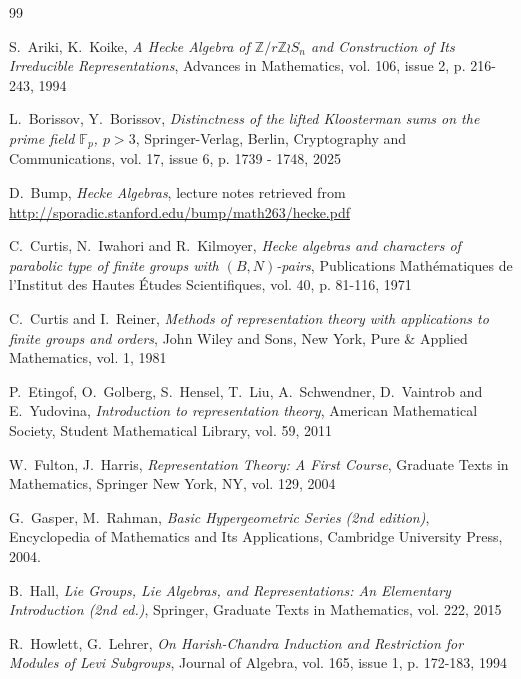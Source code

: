 \documentclass[12pt,reqno]{amsart}
\theoremstyle{definition}
\theoremstyle{remark}
\numberwithin{equation}{section}
\begin{document}
\begin{thebibliography}{99}

S.~Ariki, K.~Koike, {\em A Hecke Algebra of $\mathbb{Z}/r\mathbb{Z} \wr S_n$ and Construction of Its Irreducible Representations},
Advances in Mathematics, vol. 106, issue 2, p. 216-243, 1994

L.~Borissov, Y.~Borissov, {\em Distinctness of the lifted Kloosterman sums on the prime field $\mathbb{F}_p$, $p>3$}, Springer-Verlag, Berlin, Cryptography and Communications, vol. 17, issue 6, p. 1739 - 1748, 2025



D.~Bump, {\em Hecke Algebras}, lecture notes retrieved from \hyperlink{http://sporadic.stanford.edu/bump/math263/hecke.pdf}{http://sporadic.stanford.edu/bump/math263/hecke.pdf}

C.~Curtis, N.~Iwahori and R.~Kilmoyer, {\em Hecke algebras and characters of parabolic type of finite groups with $(B, N)$-pairs}, Publications Math\'ematiques de l'Institut des Hautes \'Etudes Scientifiques, vol. 40, p. 81-116, 1971

C.~Curtis and I.~Reiner, {\em Methods of representation theory with applications
to finite groups and orders}, John Wiley and Sons, New York, Pure \& Applied Mathematics, vol. 1, 1981

P.~Etingof, O.~Golberg, S.~Hensel, T.~Liu, A.~Schwendner, D.~Vaintrob and E.~Yudovina, {\em Introduction to representation theory}, American Mathematical Society, Student Mathematical Library, vol. 59, 2011 

W.~Fulton, J.~Harris, {\em Representation Theory: A First Course}, Graduate Texts in Mathematics, Springer New York, NY, vol. 129, 2004

G.~Gasper, M.~Rahman, {\em Basic Hypergeometric Series (2nd edition)}, Encyclopedia of Mathematics and Its Applications, Cambridge University Press, 2004.

B.~Hall, {\em Lie Groups, Lie Algebras, and Representations: An Elementary Introduction (2nd ed.)}, Springer, Graduate Texts in Mathematics, vol. 222, 2015

R.~Howlett, G.~Lehrer, {\em On Harish-Chandra Induction and Restriction for Modules of Levi Subgroups}, Journal of Algebra, vol. 165, issue 1, p. 172-183, 1994


\end{thebibliography}
\end{document}
